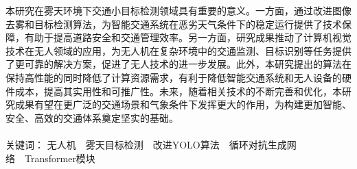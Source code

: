 \begin{cnabstract}
本研究在雾天环境下交通小目标检测领域具有重要的意义。一方面，通过改进图像去雾和目标检测算法，为智能交通系统在恶劣天气条件下的稳定运行提供了技术保障，有助于提高道路安全和交通管理效率。另一方面，研究成果推动了计算机视觉技术在无人领域的应用，为无人机在复杂环境中的交通监测、目标识别等任务提供了更可靠的解决方案，促进了无人技术的进一步发展。此外，本研究提出的算法在保持高性能的同时降低了计算资源需求，有利于降低智能交通系统和无人设备的硬件成本，提高其实用性和可推广性。未来，随着相关技术的不断完善和优化，本研究成果有望在更广泛的交通场景和气象条件下发挥更大的作用，为构建更加智能、安全、高效的交通体系奠定坚实的基础。
\\
\\
\heiti 关键词：
\songti 无人机\ \ 雾天目标检测\ \ 改进YOLO算法\ \ 循环对抗生成网络\ \ Transformer模块

\end{cnabstract}
\pagebreak



